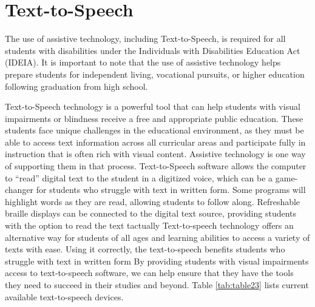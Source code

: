 \documentclass[12pt,letterpaper,twoside]{extreport}
\begin{document}
\pagebreak \hypertarget{text-to-speech}{}\section{Text-to-Speech}\label{text-to-speech}
The use of assistive technology, including Text-to-Speech, is required for all students with disabilities under the Individuals with Disabilities Education Act (IDEIA). It is important to note that the use of assistive technology helps prepare students for independent living, vocational pursuits, or higher education following graduation from high school. 

Text-to-Speech technology is a powerful tool that can help students with visual impairments or blindness receive a free and appropriate public education. These students face unique challenges in the educational environment, as they must be able to access text information across all curricular areas and participate fully in instruction that is often rich with visual content. Assistive technology is one way of supporting them in that process. Text-to-Speech software allows the computer to “read” digital text to the student in a digitized voice, which can be a game-changer for students who struggle with text in written form. Some programs will highlight words as they are read, allowing students to follow along. Refreshable braille displays can be connected to the digital text source, providing students with the option to read the text tactually Text-to-speech technology offers an alternative way for students of all ages and learning abilities to access a variety of texts with ease. Using it correctly, the text-to-speech benefits students who struggle with text in written form By providing students with visual impairments access to text-to-speech software, we can help ensure that they have the tools they need to succeed in their studies and beyond. Table \ref{tab:table23} lists current available text-to-speech devices.
\end{document}
